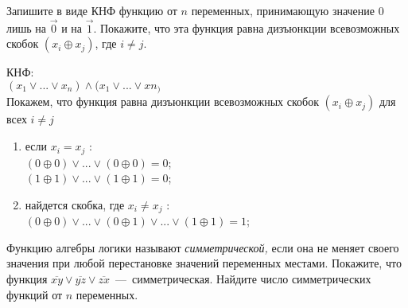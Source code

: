 \begin{exercise}
Запишите в виде КНФ функцию от $n$ переменных, принимающую значение
	$0$ лишь на $\vec{0}$ и на $\vec{1}$. Покажите, что эта функция равна
	дизъюнкции всевозможных скобок $(x_i\oplus x_j)$, где $i\neq j$. 
\end{exercise}

\begin{solution}
КНФ:\\
$(x_1 \vee ...\vee x_n)\wedge(x_1 \vee ...\vee xn_)$\\
Покажем, что функция равна дизъюнкции всевозможных скобок $(x_i\oplus  x_j )$ для всех $i\neq j$
\begin{enumerate}
\item если $x_i=x_j$ :\\
$(0\oplus 0) \vee  ... \vee (0\oplus0) = 0$;\\
$(1 \oplus 1) \vee ... \vee (1\oplus 1) = 0$;
\item найдется скобка, где $x_i\neq x_j$ :\\
$(0 \oplus 0) \vee ... \vee (0 \oplus 1) \vee ... \vee (1 \oplus 1) = 1$;
\end{enumerate}
\end{solution}

\begin{exercise}
Функцию алгебры логики называют \textit{симметрической,} если она не 
	меняет своего значения при любой перестановке значений переменных местами.
	Покажите, что функция $\overline{xy}\vee\overline{yz}\vee\overline{zx}$~---~симметрическая.
	Найдите число симметрических функций от $n$ переменных.
\end{exercise}

